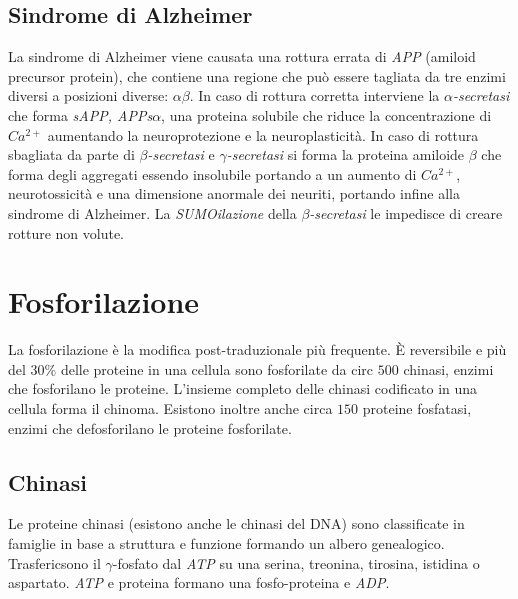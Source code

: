 \subsection{Sindrome di Alzheimer}
La sindrome di Alzheimer viene causata una rottura errata di \emph{APP} (amiloid precursor protein), che contiene una regione che pu\`o essere tagliata da tre enzimi diversi a posizioni diverse: $\alpha\beta$. 
In caso di rottura corretta interviene la \emph{$\alpha$-secretasi} che forma \emph{sAPP, APPs$\alpha$}, una proteina solubile che riduce la concentrazione di \emph{$Ca^{2+}$} aumentando la neuroprotezione e la neuroplasticit\`a. 
In caso di rottura sbagliata da parte di \emph{$\beta$-secretasi} e \emph{$\gamma$-secretasi} si forma la proteina amiloide $\beta$ che forma degli aggregati essendo insolubile portando a un aumento di \emph{$Ca^{2+}$}, neurotossicit\`a e una dimensione anormale dei neuriti, portando infine alla sindrome di Alzheimer. 
La \emph{SUMOilazione} della \emph{$\beta$-secretasi} le impedisce di creare rotture non volute.

\section{Fosforilazione}
La fosforilazione \`e la modifica post-traduzionale pi\`u frequente.
\`E reversibile e pi\`u del $30\%$ delle proteine in una cellula sono fosforilate da circ $500$ chinasi, enzimi che fosforilano le proteine.
L'insieme completo delle chinasi codificato in una cellula forma il chinoma. 
Esistono inoltre anche circa $150$ proteine fosfatasi, enzimi che defosforilano le proteine fosforilate.
	
	\subsection{Chinasi}
	Le proteine chinasi (esistono anche le chinasi del DNA) sono classificate in famiglie in base a struttura e funzione formando un albero genealogico. 
	Trasfericsono il $\gamma$-fosfato dal \emph{ATP} su una serina, treonina, tirosina, istidina o aspartato. 
	\emph{ATP} e proteina formano una fosfo-proteina e \emph{ADP}. 
		
